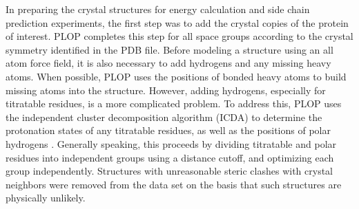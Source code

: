 In preparing the crystal structures for energy calculation and side chain prediction experiments, the first step was to add the crystal copies of the protein of interest.
PLOP completes this step for all space groups according to the crystal symmetry identified in the PDB file.
Before modeling a structure using an all atom force field, it is also necessary to add hydrogens and any missing heavy atoms.
When possible, PLOP uses the positions of bonded heavy atoms to build missing atoms into the structure.
However, adding hydrogens, especially for titratable residues, is a more complicated problem.
To address this, PLOP uses the independent cluster decomposition algorithm (ICDA) to determine the protonation states of any titratable residues, as well as the positions of polar hydrogens \cite{li2007assignment}.
Generally speaking, this proceeds by dividing titratable and polar residues into independent groups using a distance cutoff, and optimizing each group independently.
Structures with unreasonable steric clashes with crystal neighbors were removed from the data set on the basis that such structures are physically unlikely.
